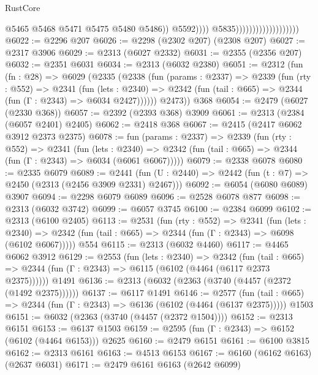 \begin{lexlean}{RustCore}
\begin{coremodule}
                                                      @5465
                                                      @5468
                                                      @5471
                                                      @5475
                                                      @5480
                                                      @5486))
                                                  @5592))))
                                          @5835)))))))))))))))))))
@6022 := @2296 @207
@6026 := @2298 (@2302 @207) (@2308 @207)
@6027 := @2317 @3906
@6029 := @2313 (@6027 @2332)
@6031 := @2355 (@2356 @207)
@6032 := @2351 @6031
@6034 := @2313 (@6032 @2380)
@6051 := @2312
    (fun (fn : @28) =>
    @6029
      (@2335
        (@2338
          (fun (params : @2337) =>
          @2339
            (fun (rty : @552) =>
            @2341
              (fun (lets : @2340) =>
              @2342 (fun (tail : @665) => @2344 (fun (Γ : @2343) => @6034 @2427))))))
        @2473))
    @368
@6054 := @2479 (@6027 (@2330 @368))
@6057 := @2392 (@2393 @368) @3909
@6061 := @2313 (@2384 (@6057 @2401) @2405)
@6062 := @2418 @368
@6067 := @2415 (@2417 @6062 @3912 @2373 @2375)
@6078 := fun (params : @2337) =>
  @2339
    (fun (rty : @552) =>
    @2341
      (fun (lets : @2340) =>
      @2342 (fun (tail : @665) => @2344 (fun (Γ : @2343) => @6034 (@6061 @6067)))))
@6079 := @2338 @6078
@6080 := @2335 @6079
@6089 := @2441 (fun (U : @2440) => @2442 (fun (t : @7) => @2450 (@2313 (@2456 @3909 @2331) @2467)))
@6092 := @6054 (@6080 @6089) @3907
@6094 := @2298 @6079 @6089
@6096 := @2528 @6078 @877
@6098 := @2313 (@6032 @3742)
@6099 := @6057 @3745
@6100 := @2384 @6099
@6102 := @2313 (@6100 @2405)
@6113 := @2531
    (fun (rty : @552) =>
    @2341
      (fun (lets : @2340) =>
      @2342 (fun (tail : @665) => @2344 (fun (Γ : @2343) => @6098 (@6102 @6067)))))
    @554
@6115 := @2313 (@6032 @4460)
@6117 := @4465 @6062 @3912
@6129 := @2553
    (fun (lets : @2340) =>
    @2342
      (fun (tail : @665) => @2344 (fun (Γ : @2343) => @6115 (@6102 (@4464 (@6117 @2373 @2375))))))
    @1491
@6136 := @2313 (@6032 (@2363 (@3740 (@4457 (@2372 (@1492 @2375))))))
@6137 := @6117 @1491
@6146 := @2577
    (fun (tail : @665) => @2344 (fun (Γ : @2343) => @6136 (@6102 (@4464 (@6137 @2375)))))
    @1503
@6151 := @6032 (@2363 (@3740 (@4457 (@2372 @1504))))
@6152 := @2313 @6151
@6153 := @6137 @1503
@6159 := @2595 (fun (Γ : @2343) => @6152 (@6102 (@4464 @6153))) @2625
@6160 := @2479 @6151
@6161 := @6100 @3815
@6162 := @2313 @6161
@6163 := @4513 @6153
@6167 := @6160 (@6162 @6163) (@2637 @6031)
@6171 := @2479 @6161 @6163 (@2642 @6099)

\end{coremodule}
\end{lexlean}

